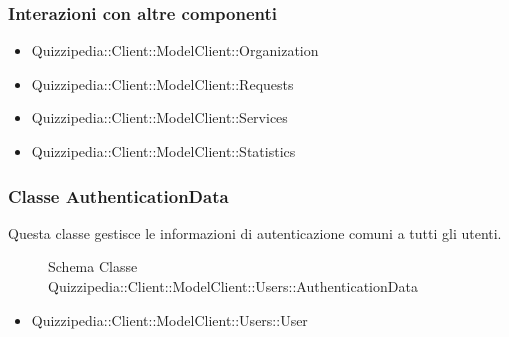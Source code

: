 \subsubsection{Interazioni con altre componenti}
\begin{itemize}
\item Quizzipedia::Client::ModelClient::Organization
\item Quizzipedia::Client::ModelClient::Requests
\item Quizzipedia::Client::ModelClient::Services
\item Quizzipedia::Client::ModelClient::Statistics
\end{itemize}
\subsubsection{Classe AuthenticationData}
Questa classe gestisce le informazioni di autenticazione comuni a tutti gli utenti.
\begin{figure}[H]
\centering
\noindent{}
\caption[Schema Classe AuthenticationData]{Schema Classe Quizzipedia::Client::ModelClient::Users::AuthenticationData}
\end{figure}
\begin{itemize}
\item Quizzipedia::Client::ModelClient::Users::User
\end{itemize}
